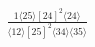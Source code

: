 \documentclass[varwidth, border=5pt]{standalone}
\begin{document}
\begin{my}
$\begin{gathered}
\scriptscriptstyle\frac{1⟨25⟩[24]^2⟨24⟩}{⟨12⟩[25]^2⟨34⟩⟨35⟩}
\end{gathered}$
\end{my}
\end{document}
